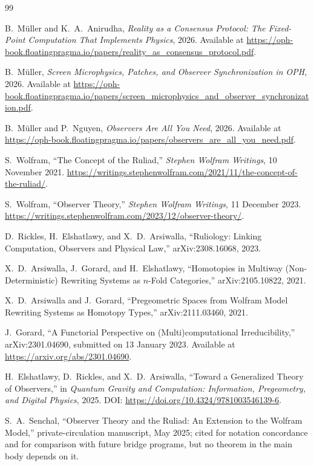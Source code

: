 \documentclass[11pt]{article}
\theoremstyle{remark}
\theoremstyle{plain}
\begin{document}
\begin{thebibliography}{99}

B.~M\"uller and K.~A.~Anirudha,
\emph{Reality as a Consensus Protocol: The Fixed-Point Computation That Implements Physics},
2026.
Available at \url{https://oph-book.floatingpragma.io/papers/reality_as_consensus_protocol.pdf}.

B.~M\"uller,
\emph{Screen Microphysics, Patches, and Observer Synchronization in OPH},
2026.
Available at \url{https://oph-book.floatingpragma.io/papers/screen_microphysics_and_observer_synchronization.pdf}.

B.~M\"uller and P.~Nguyen,
\emph{Observers Are All You Need},
2026.
Available at \url{https://oph-book.floatingpragma.io/papers/observers_are_all_you_need.pdf}.

S.~Wolfram,
``The Concept of the Ruliad,''
\emph{Stephen Wolfram Writings}, 10 November 2021.
\url{https://writings.stephenwolfram.com/2021/11/the-concept-of-the-ruliad/}.

S.~Wolfram,
``Observer Theory,''
\emph{Stephen Wolfram Writings}, 11 December 2023.
\url{https://writings.stephenwolfram.com/2023/12/observer-theory/}.

D.~Rickles, H.~Elshatlawy, and X.~D.~Arsiwalla,
``Ruliology: Linking Computation, Observers and Physical Law,''
arXiv:2308.16068, 2023.

X.~D.~Arsiwalla, J.~Gorard, and H.~Elshatlawy,
``Homotopies in Multiway (Non-Deterministic) Rewriting Systems as \(n\)-Fold Categories,''
arXiv:2105.10822, 2021.

X.~D.~Arsiwalla and J.~Gorard,
``Pregeometric Spaces from Wolfram Model Rewriting Systems as Homotopy Types,''
arXiv:2111.03460, 2021.

J.~Gorard,
``A Functorial Perspective on (Multi)computational Irreducibility,''
arXiv:2301.04690, submitted on 13 January 2023.
Available at \url{https://arxiv.org/abs/2301.04690}.

H.~Elshatlawy, D.~Rickles, and X.~D.~Arsiwalla,
``Toward a Generalized Theory of Observers,''
in \emph{Quantum Gravity and Computation: Information, Pregeometry, and Digital Physics},
2025.
DOI: \url{https://doi.org/10.4324/9781003546139-6}.

S.~A.~Senchal,
``Observer Theory and the Ruliad: An Extension to the Wolfram Model,''
private-circulation manuscript, May 2025; cited for notation concordance and for comparison with future bridge programs, but no theorem in the main body depends on it.

\end{thebibliography}
\end{document}
